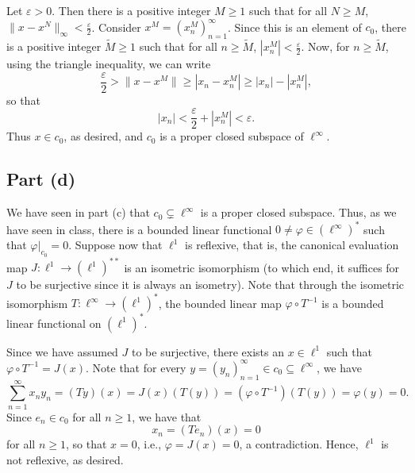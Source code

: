 \documentclass[11pt]{article}
\theoremstyle{thmstyle}
\theoremstyle{defstyle}
\newcommand{\wt}[1]{\widetilde{#1}}
\renewcommand{\ge}{\geqslant}
\begin{document}
Let $\varepsilon > 0$. Then there is a positive integer $M\ge 1$ such that for all $N\ge M$, $\|x - x^N\|_\infty < \frac{\varepsilon}{2}$. Consider $x^M = (x^M_n)_{n = 1}^\infty$. Since this is an element of $c_0$, there is a positive integer $\wt M\ge 1$ such that for all $n\ge\wt M$, $|x^M_n| < \frac{\varepsilon}{2}$. Now, for $n\ge\wt M$, using the triangle inequality, we can write 
\begin{equation*}
    \frac{\varepsilon}{2} > \|x - x^M\|\ge |x_n - x^M_n|\ge|x_n| - |x^M_n|,
\end{equation*}
so that 
\begin{equation*}
    |x_n| < \frac{\varepsilon}{2} + |x^M_n| < \varepsilon.
\end{equation*}
Thus $x\in c_0$, as desired, and $c_0$ is a proper closed subspace of $\ell^\infty$.

\subsection{Part (d)}

We have seen in part (c) that $c_0\subsetneq \ell^\infty$ is a proper closed subspace. Thus, as we have seen in class, there is a bounded linear functional $0\ne\varphi\in\left(\ell^\infty\right)^\ast$ such that $\varphi|_{c_0} = 0$. Suppose now that $\ell^1$ is reflexive, that is, the canonical evaluation map $J\colon\ell^1\to\left(\ell^1\right)^{\ast\ast}$ is an isometric isomorphism (to which end, it suffices for $J$ to be surjective since it is always an isometry). 
Note that through the isometric isomorphism $T\colon\ell^\infty\to\left(\ell^1\right)^\ast$, the bounded linear map $\varphi\circ T^{-1}$ is a bounded linear functional on $\left(\ell^1\right)^\ast$. 

Since we have assumed $J$ to be surjective, there exists an $x\in\ell^1$ such that $\varphi\circ T^{-1} = J(x)$. Note that for every $y = (y_n)_{n = 1}^\infty\in c_0\subseteq\ell^\infty$, we have 
\begin{equation*}
    \sum_{n = 1}^\infty x_ny_n = (Ty)(x) = J(x)\left(T(y)\right) = \left(\varphi\circ T^{-1}\right)\left(T(y)\right) = \varphi(y) = 0.
\end{equation*}
Since $e_n\in c_0$ for all $n\ge 1$, we have that 
\begin{equation*}
    x_n = (Te_n)(x) = 0
\end{equation*}
for all $n\ge 1$, so that $x = 0$, i.e., $\varphi = J(x) = 0$, a contradiction. Hence, $\ell^1$ is not reflexive, as desired.
\end{document}
